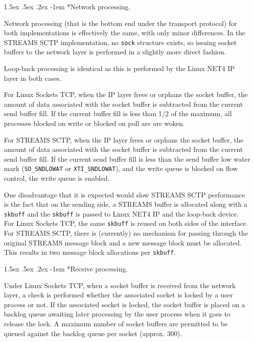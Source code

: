 \documentclass[letterpaper,final,notitlepage,twocolumn,10pt,twoside]{article}
\makeatletter
\let\normalsize = \small
\let\small = \footnotesize
\let\footnotesize = \scriptsize
\let\scriptsize = \tiny
\renewcommand\paragraph{\@startsection{paragraph}{4}{\z@}%
                                    {1.5ex \@plus .5ex \@minus .2ex}%
                                    {-1em}%
                                    {\normalfont\normalsize\bfseries\slshape}}
\makeatother
\begin{document}
\paragraph*{Network processing.}

Network processing (that is the bottom end under the transport protocol) for both implementations is
effectively the same, with only minor differences.  In the STREAMS SCTP implementation, no
\texttt{sock} structure exists, so issuing socket buffers to the network layer is performed in a
slightly more direct fashion.

Loop-back processing is identical as this is performed by the Linux NET4 IP layer in both cases.

For Linux Sockets TCP, when the IP layer frees or orphans the socket buffer, the amount of data
associated with the socket buffer is subtracted from the current send buffer fill.  If the current
buffer fill is less than 1/2 of the maximum, all processes blocked on write or blocked on poll are
are woken.

For STREAMS SCTP, when the IP layer frees or orphans the socket buffer, the amount of data
associated with the socket buffer is subtracted from the current send buffer fill.  If the current
send buffer fill is less than the send buffer low water mark (\texttt{SO\_SNDLOWAT} or
\texttt{XTI\_SNDLOWAT}), and the write queue is blocked on flow control, the write queue is enabled.

One disadvantage that it is expected would slow STREAMS SCTP performance is the fact that on the
sending side, a STREAMS buffer is allocated along with a \texttt{skbuff} and the \texttt{skbuff} is
passed to Linux NET4 IP and the loop-back device.  For Linux Sockets TCP, the same \texttt{skbuff}
is reused on both sides of the interface.  For STREAMS SCTP, there is (currently) no mechanism for
passing through the original STREAMS message block and a new message block must be allocated.  This
results in two message block allocations per \texttt{skbuff}.

\paragraph*{Receive processing.}

Under Linux Sockets TCP, when a socket buffer is received from the network layer, a check is
performed whether the associated socket is locked by a user process or not.  If the associated
socket is locked, the socket buffer is placed on a backlog queue awaiting later processing by the
user process when it goes to release the lock.  A maximum number of socket buffers are permitted to
be queued against the backlog queue per socket (approx. 300).
\end{document}
